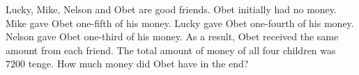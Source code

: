 Lucky, Mike, Nelson and Obet are good friends. Obet initially had no money. Mike gave Obet one-fifth of his money. Lucky gave Obet one-fourth of his money. Nelson gave Obet one-third of his money. As a result, Obet received the same amount from each friend. The total amount of money of all four children was $7200$ tenge. How much money did Obet have in the end?
